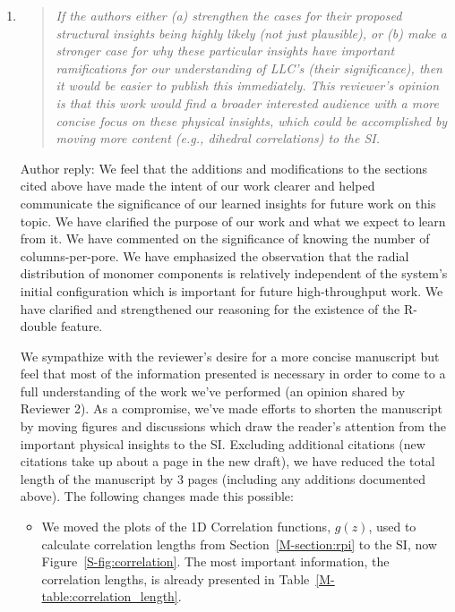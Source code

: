 \documentclass{article}
\begin{document}
\begin{enumerate}

	\item \begin{quote}
    \textit{If the authors either (a) strengthen the cases for their proposed structural
    insights being  highly likely (not just plausible), or (b) make a stronger case for
    why these particular insights have important ramifications for our understanding of 
    LLC's (their significance), then it would be easier to publish this immediately. This
    reviewer's opinion is that this work would find a broader interested audience with a more
    concise focus on these physical insights, which could be accomplished by moving more
    content (e.g., dihedral correlations) to the SI.}
    \end{quote}
    
    Author reply: We feel that the additions and modifications to the sections cited above 
    have made the intent of our work clearer and helped communicate the significance of 
    our learned insights for future work on this topic. We have clarified the purpose of our work
    and what we expect to learn from it. We have commented on the significance of knowing the
    number of columns-per-pore. We have emphasized the observation that the radial distribution
    of monomer components is relatively independent of the system's initial configuration
    which is important for future high-throughput work. We have clarified and strengthened our
    reasoning for the existence of the R-double feature.
    
    We sympathize with the reviewer's desire for a more concise manuscript but feel that most 
    of the information presented is necessary in order to come to a full understanding of the 
    work we've performed (an opinion shared by Reviewer 2). As a compromise, we've made efforts 
    to shorten the manuscript by moving figures and discussions which draw the reader's attention
    from the important physical insights to the SI. Excluding additional citations (new citations
    take up about a page in the new draft), we have reduced the total length of the manuscript 
    by 3 pages (including any additions documented above). The following changes made this possible:
    
    \begin{itemize}
    
    \item We moved the plots of the 1D Correlation functions, $g(z)$, used to calculate 
    correlation lengths from Section~\ref{M-section:rpi} to the SI, now Figure~\ref{S-fig:correlation}.
    The most important information, the correlation lengths, is already presented in 
    Table~\ref{M-table:correlation_length}.
    

\end{itemize}
\end{enumerate}
\end{document}
